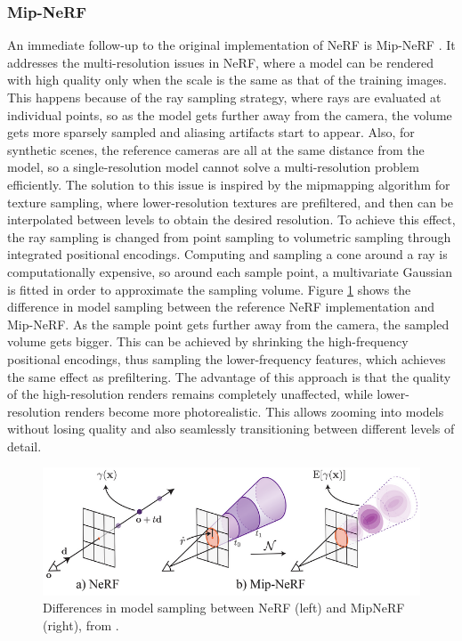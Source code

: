 \subsubsection{Mip-NeRF}
An immediate follow-up to the original implementation of NeRF is Mip-NeRF \cite{barron2021mipnerf}. It addresses the multi-resolution issues in NeRF, where a model can be rendered with high quality only when the scale is the same as that of the training images. This happens because of the ray sampling strategy, where rays are evaluated at individual points, so as the model gets further away from the camera, the volume gets more sparsely sampled and aliasing artifacts start to appear. Also, for synthetic scenes, the reference cameras are all at the same distance from the model, so a single-resolution model cannot solve a multi-resolution problem efficiently. The solution to this issue is inspired by the mipmapping algorithm for texture sampling, where lower-resolution textures are prefiltered, and then can be interpolated between levels to obtain the desired resolution. To achieve this effect, the ray sampling is changed from point sampling to volumetric sampling through integrated positional encodings. Computing and sampling a cone around a ray is computationally expensive, so around each sample point, a multivariate Gaussian is fitted in order to approximate the sampling volume. Figure \ref{fig:mipnerf} shows the difference in model sampling between the reference NeRF implementation and Mip-NeRF. As the sample point gets further away from the camera, the sampled volume gets bigger. This can be achieved by shrinking the high-frequency positional encodings, thus sampling the lower-frequency features, which achieves the same effect as prefiltering. The advantage of this approach is that the quality of the high-resolution renders remains completely unaffected, while lower-resolution renders become more photorealistic. This allows zooming into models without losing quality and also seamlessly transitioning between different levels of detail.

\begin{figure}[H]
    \centering
    \includegraphics[width=0.6\linewidth]{figures/mipnerf.png}
    \caption{Differences in model sampling between NeRF (left) and MipNeRF (right), from \cite{barron2021mipnerf}. }
    \label{fig:mipnerf}
\end{figure}

